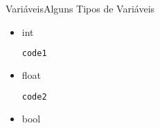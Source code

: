 \documentclass{beamer}
\begin{document}
      

\begin{frame}[fragile]{Variáveis}{Alguns Tipos de Variáveis}

\begin{itemize}
\item int

\begin{lstlisting}[language=Python,tabsize=2]
  code1
\end{lstlisting}

\item float

\begin{lstlisting}[language=Python,tabsize=2]
  code2
\end{lstlisting}

\item bool
\end{itemize}   

\end{frame}      
\end{document}

